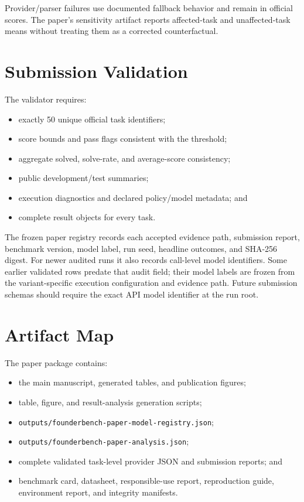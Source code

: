 \documentclass[sigconf]{acmart}
\begin{document}
Provider/parser failures use documented fallback behavior and remain in official scores.
The paper's sensitivity artifact reports affected-task and unaffected-task means without treating them as a corrected counterfactual.


\section{Submission Validation}
The validator requires:
\begin{itemize}
  \item exactly 50 unique official task identifiers;
  \item score bounds and pass flags consistent with the threshold;
  \item aggregate solved, solve-rate, and average-score consistency;
  \item public development/test summaries;
  \item execution diagnostics and declared policy/model metadata; and
  \item complete result objects for every task.
\end{itemize}
The frozen paper registry records each accepted evidence path, submission report, benchmark version, model label, run seed, headline outcomes, and SHA-256 digest.
For newer audited runs it also records call-level model identifiers.
Some earlier validated rows predate that audit field; their model labels are frozen from the variant-specific execution configuration and evidence path.
Future submission schemas should require the exact API model identifier at the run root.

\section{Artifact Map}
The paper package contains:
\begin{itemize}
  \item the main manuscript, generated tables, and publication figures;
  \item table, figure, and result-analysis generation scripts;
  \item \texttt{outputs/founderbench-paper-model-registry.json};
  \item \texttt{outputs/founderbench-paper-analysis.json};
  \item complete validated task-level provider JSON and submission reports; and
  \item benchmark card, datasheet, responsible-use report, reproduction guide,
        environment report, and integrity manifests.
\end{itemize}
\end{document}
